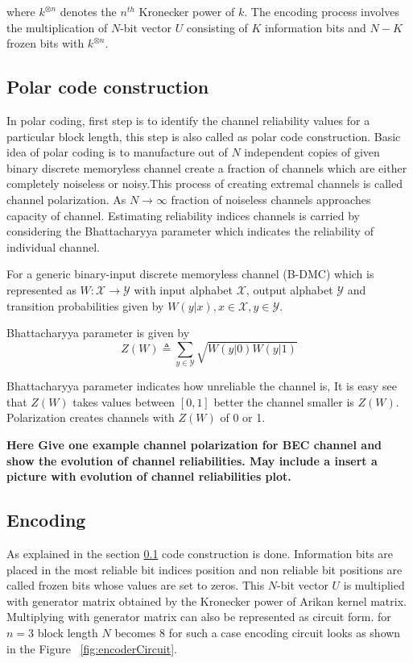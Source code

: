 where $k^{\otimes n}$ denotes the $n^{th}$ Kronecker power of $k$. The encoding process involves the multiplication of $N$-bit vector $U$ consisting of $K$ information bits and $N-K$ frozen bits with $k^{\otimes n}$.

\subsection{Polar code construction} \label{CodeConstruction}

In polar coding, first step is to identify the channel reliability values for a particular block length, this step is also called as polar code construction. Basic idea of polar coding is to manufacture out of $N$ independent copies of given binary discrete memoryless channel create a fraction of channels which are either completely noiseless or noisy.This process of creating extremal channels is called channel polarization. As $N\to\infty$ fraction of noiseless channels approaches capacity of channel. Estimating reliability indices channels is carried by considering the Bhattacharyya parameter which indicates the reliability of individual channel.
 
For a generic binary-input discrete memoryless channel (B-DMC) which is represented as $W \colon \mathcal{X} \to \mathcal{Y}$ with input alphabet $\mathcal{X}$, output alphabet $\mathcal{Y}$ and transition probabilities given by $W(y|x),x \in \mathcal{X}, y \in \mathcal{Y}$.

Bhattacharyya parameter is given by 
\begin{equation}
	Z(W) \triangleq \sum_{y \in \mathcal{Y}} \sqrt{W(y|0)W(y|1)}
\end{equation}

Bhattacharyya parameter indicates how unreliable the channel is, It is easy see that $Z(W)$ takes values between $[0,1]$ better the channel smaller is $Z(W)$. Polarization creates channels with $Z(W)$ of 0 or 1.

\textbf{Here Give one example channel polarization for BEC channel and show the evolution of channel reliabilities. May include a insert a picture with evolution of channel reliabilities plot.}


\subsection{Encoding} \label{polarEncoding}
As explained in the section \ref{CodeConstruction} code construction is done. Information bits are placed in the most reliable bit indices position and non reliable bit positions are called frozen bits whose values are set to zeros. This $N$-bit vector $U$ is multiplied with generator matrix obtained by the Kronecker power of Arikan kernel matrix. Multiplying with generator matrix can also be represented as circuit form. for $n = 3$ block length $N$ becomes 8 for such a case encoding circuit looks as shown in the  Figure ~\ref{fig:encoderCircuit}. \newline

